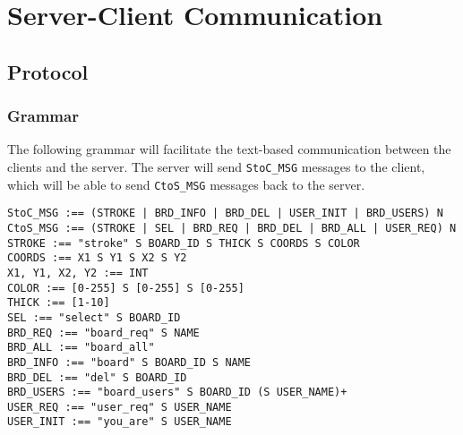 \section{Server-Client Communication}

\subsection{Protocol}

\subsubsection{Grammar}
The following grammar will facilitate the text-based communication between the clients and the server. The server will send \texttt{StoC\_MSG} messages to the client, which will be able to send \texttt{CtoS\_MSG} messages back to the server.

\vspace{5mm}

\setlength{\parindent}{0in}

\texttt{StoC\_MSG :== (STROKE | BRD\_INFO | BRD\_DEL | USER\_INIT | BRD\_USERS) N}\\

\texttt{CtoS\_MSG :== (STROKE | SEL | BRD\_REQ | BRD\_DEL | BRD\_ALL | USER\_REQ) N}\\


\texttt{STROKE :== "stroke" S BOARD\_ID S THICK S COORDS S COLOR}\\
\texttt{COORDS :== X1 S Y1 S X2 S Y2}\\
\texttt{X1, Y1, X2, Y2 :== INT}\\
\texttt{COLOR :== [0-255] S [0-255] S [0-255]}\\
\texttt{THICK :== [1-10]}\\

\texttt{SEL :== "select" S BOARD\_ID}\\

\texttt{BRD\_REQ :== "board\_req" S NAME}\\
\texttt{BRD\_ALL :== "board\_all"}\\
\texttt{BRD\_INFO :== "board" S BOARD\_ID S NAME}\\
\texttt{BRD\_DEL :== "del" S BOARD\_ID}\\
\texttt{BRD\_USERS :== "board\_users" S BOARD\_ID (S USER\_NAME)+}\\

\texttt{USER\_REQ :== "user\_req" S USER\_NAME}\\
\texttt{USER\_INIT :== "you\_are" S USER\_NAME}\\

